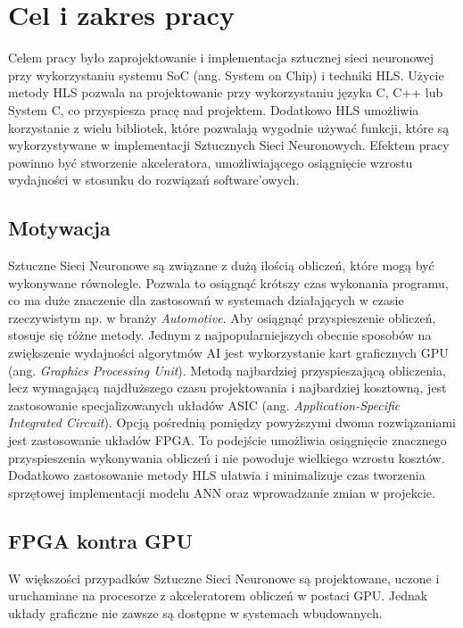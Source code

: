 \newpage %
\cleardoublepage %
\pagestyle{headings}

\section{Cel i zakres pracy}
Celem pracy było zaprojektowanie i implementacja sztucznej sieci neuronowej 
przy wykorzystaniu systemu SoC (ang. System on Chip) i techniki HLS. 
Użycie metody HLS pozwala na projektowanie  przy wykorzystaniu języka 
C, C++ lub System C, co przyspiesza pracę nad projektem. Dodatkowo HLS umożliwia
korzystanie z wielu bibliotek, które pozwalają wygodnie używać funkcji,
które są wykorzystywane w implementacji Sztucznych Sieci Neuronowych. 
Efektem pracy powinno być stworzenie akceleratora, umożliwiającego osiągnięcie 
wzrostu wydajności w stosunku do rozwiązań software’owych.

\subsection{Motywacja}
Sztuczne Sieci Neuronowe są związane z dużą ilością obliczeń, które mogą 
być wykonywane równolegle. Pozwala to osiągnąć krótszy czas wykonania 
programu, co ma duże znaczenie dla zastosowań w systemach działających 
w czasie rzeczywistym np. w branży \emph{Automotive}. Aby osiągnąć przyspieszenie 
obliczeń, stosuje się różne metody. Jednym z najpopularniejszych obecnie sposobów 
na zwiększenie wydajności algorytmów AI jest wykorzystanie kart graficznych GPU 
(ang. \emph{Graphics Processing Unit}). Metodą najbardziej przyspieszającą obliczenia,
lecz wymagającą najdłuższego czasu projektowania i najbardziej kosztowną,
jest zastosowanie specjalizowanych układów ASIC (ang. \emph{Application-Specific 
Integrated Circuit}). Opcją pośrednią pomiędzy powyższymi dwoma rozwiązaniami
jest zastosowanie układów FPGA. To podejście umożliwia osiągnięcie znacznego
przyspieszenia wykonywania obliczeń i nie powoduje wielkiego wzrostu kosztów. 
Dodatkowo zastosowanie metody HLS ułatwia i minimalizuje czas tworzenia sprzętowej 
implementacji modelu ANN oraz wprowadzanie zmian w projekcie. 

\subsection{FPGA kontra GPU}
W większości przypadków Sztuczne Sieci Neuronowe są projektowane, uczone i uruchamiane na procesorze z akceleratorem obliczeń w postaci GPU. Jednak układy graficzne nie zawsze są dostępne w systemach wbudowanych. 

